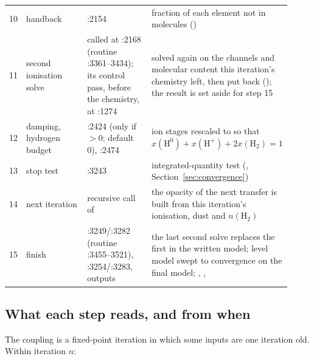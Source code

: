 \begin{longtable}{@{}L{0.04\linewidth}L{0.25\linewidth}L{0.25\linewidth}L{0.38\linewidth}@{}}
10 & handback &  :2154 & fraction of each element not in molecules () \\
11 & second ionisation solve &  called at :2168 (routine :3361--3434); its control pass, before the chemistry, at :1274 &  solved again on the channels and molecular content this iteration's chemistry left, then put back (); the result is set aside for step 15 \\
12 & damping, hydrogen budget & :2424 (only if $>0$; default 0),  :2474 & ion stages rescaled to  so that $x(\mathrm{H^0})+x(\mathrm{H^+})+2x(\mathrm{H_2})=1$ \\
13 & stop test & :3243 & integrated-quantity test (, Section~\ref{sec:convergence}) \\
14 & next iteration & recursive call of  & the opacity of the next transfer is built from this iteration's ionisation, dust and $n(\mathrm{H_2})$ \\
15 & finish &  :3249/:3282 (routine :3455--3521),  :3254/:3283, outputs & the last second solve replaces the first in the written model; level model swept to convergence on the final model; , ,  \\
\bottomrule
\end{longtable}

\subsection{What each step reads, and from when}
\label{sec:lags}

The coupling is a fixed-point iteration in which some inputs are one
iteration old. Within iteration $n$:

